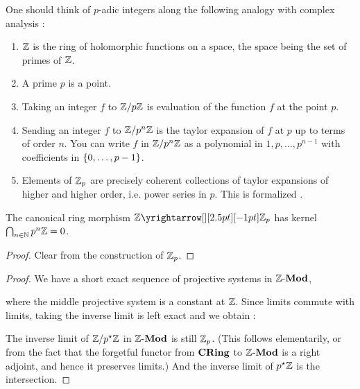 \begin{rmk}
  
  One should think of $p$-adic integers along the following analogy with 
  complex analysis : 
  \begin{enumerate}
    \item $\Z$ is the ring of holomorphic functions on a space,
    the space being the set of primes of $\Z$. 
    \item A prime $p$ is a point. 
    \item Taking an integer $f$ to $\Z/p\Z$ is evaluation of 
    the function $f$ at the point $p$. 
    \item Sending an integer $f$ to $\Z/p^n\Z$ is 
    the taylor expansion of $f$ at $p$
    up to terms of order $n$.
    You can write $f$ in $\Z/p^n\Z$ as a polynomial in $1,p,\dots,p^{n-1}$
    with coefficients in $\set{0,\dots,p-1}$. 
    \item Elements of $\Z_p$ are precisely 
    coherent collections of taylor expansions of higher and higher order,
    i.e. power series in $p$. 
    This is formalized .
  \end{enumerate}
\end{rmk}

\begin{prop}
  
  The canonical ring morphism $\map{\Z}{\Z_p}{}{}$ has kernel 
  $\bigcap_{n \in \N} p^n\Z = 0$.
\end{prop}
\begin{proof}
  
  Clear from the construction of $\Z_p$. 
\end{proof}
\begin{proof}
  
  We have a short exact sequence of projective systems in $\MOD[\Z]$, 
  \begin{figure}[H]
    \centering
  \end{figure}
  where the middle projective system is a constant at $\Z$. 
  Since limits commute with limits, 
  taking the inverse limit is left exact and we obtain : 
  \begin{figure}[H]
    \centering
  \end{figure}
  The inverse limit of $\Z/p^\star\Z$ in $\MOD[\Z]$ is still $\Z_p$. 
  (This follows elementarily, or from the fact that 
  the forgetful functor from $\CRING$ to $\MOD[\Z]$ is a right adjoint,
  and hence it preserves limits.)
  And the inverse limit of $p^\star\Z$ is the intersection. 
\end{proof}

